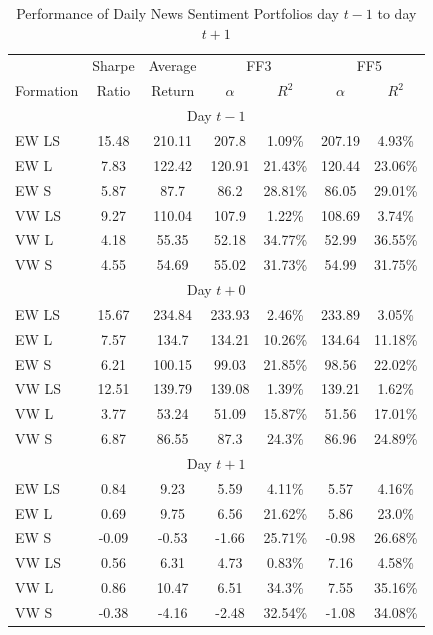 \begin{table}[!t]
\begin{center}
\begin{tabular}{lcccccc}
      \toprule
      & Sharpe &  Average & \multicolumn{2}{c}{FF3} & \multicolumn{2}{c}{FF5} \\
      \cmidrule(lr){4-5}
      \cmidrule(lr){6-7}
      Formation & Ratio & Return &  $\alpha$ & $R^2$ & $\alpha$ & $R^2$ \\
      \midrule
      \multicolumn{7}{c}{Day $t-1$} \\
EW LS & 15.48 & 210.11 & 207.8 & 1.09\% & 207.19 & 4.93\% \\
EW L & 7.83 & 122.42 & 120.91 & 21.43\% & 120.44 & 23.06\% \\
EW S & 5.87 & 87.7 &  86.2 & 28.81\% & 86.05 & 29.01\% \\
VW LS & 9.27 & 110.04 & 107.9 & 1.22\% & 108.69 & 3.74\% \\
VW L & 4.18 & 55.35 & 52.18 & 34.77\% & 52.99 & 36.55\% \\
VW S & 4.55 & 54.69 & 55.02 & 31.73\% & 54.99 & 31.75\% \\
      \multicolumn{7}{c}{Day $t+0$} \\
EW LS & 15.67 & 234.84 & 233.93 & 2.46\% & 233.89 & 3.05\% \\
EW L & 7.57 & 134.7 & 134.21 & 10.26\% & 134.64 & 11.18\% \\
EW S & 6.21 & 100.15 & 99.03 & 21.85\% & 98.56 & 22.02\% \\
VW LS & 12.51 & 139.79 & 139.08 & 1.39\% & 139.21 & 1.62\% \\
VW L & 3.77 & 53.24 & 51.09 & 15.87\% & 51.56 & 17.01\% \\
VW S & 6.87 & 86.55 & 87.3 & 24.3\% & 86.96 & 24.89\% \\
      \multicolumn{7}{c}{Day $t+1$} \\
EW LS & 0.84 & 9.23 & 5.59 & 4.11\% & 5.57 & 4.16\% \\
EW L & 0.69 & 9.75 & 6.56 & 21.62\% & 5.86 & 23.0\% \\
EW S & -0.09 & -0.53 & -1.66 & 25.71\% & -0.98 & 26.68\% \\
VW LS & 0.56 & 6.31 & 4.73 & 0.83\% & 7.16 & 4.58\% \\
VW L & 0.86 & 10.47 & 6.51 & 34.3\% & 7.55 & 35.16\% \\
VW S & -0.38 & -4.16 & -2.48 & 32.54\% & -1.08 & 34.08\% \\
      \bottomrule
\end{tabular}
\caption{Performance of Daily News Sentiment Portfolios day $t-1$ to day $t+1$}
\label{portfolio-performance-day-1}
\end{center}
\end{table}

